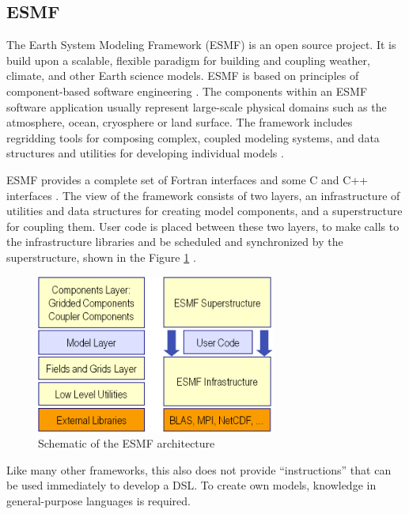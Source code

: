 \subsection{ESMF}
\par
The Earth System Modeling Framework (ESMF) is an open source project. It is build upon a scalable, flexible paradigm for building and coupling weather, climate, and other Earth science models. ESMF is based on principles of component-based software engineering \autocite{dsl:esmf-homepage}. The components within an ESMF software application usually represent large-scale physical domains such as the atmosphere, ocean, cryosphere or land surface. The framework includes regridding tools for composing complex, coupled modeling systems, and data structures and utilities for developing individual models \autocite{dsl:esmf-free_lib}.
\par
ESMF provides a complete set of Fortran interfaces and some C and C++ interfaces \autocite{dsl:esmf-tutorial1}. The view of the framework consists of two layers, an infrastructure of utilities and data structures for creating model components, and a superstructure for coupling them. User code is placed between these two layers, to make calls to the infrastructure libraries and be scheduled and synchronized by the superstructure, shown in the Figure \ref{fig:esmf_architecture} \autocite{dsl:esmf-overview}.
\begin{figure}[h]
	\centering
	\includegraphics[width=0.7\textwidth]{pics/esmf/esmf_architecture.png}
	\caption{Schematic of the ESMF architecture \autocite{dsl:esmf-regridding} \label{fig:esmf_architecture}}	
\end{figure}
\par
Like many other frameworks, this also does not provide “instructions” that can be used immediately to develop a DSL. To create own models, knowledge in general-purpose languages is required.


